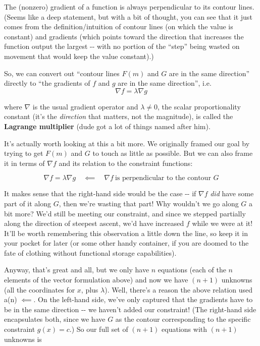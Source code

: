 \documentclass[letterpaper,12pt]{report}
\begin{document}
The (nonzero) gradient of a function is always perpendicular to its
contour lines. (Seems like a deep statement, but with a bit of thought,
you can see that it just comes from the definition/intuition of contour
lines (on which the value is constant) and gradients (which points
toward the direction that increases the function output the largest -\/-
with no portion of the ``step'' being wasted on movement that would keep
the value constant).)

So, we can convert out ``contour lines \(F(m)\) and \(G\) are in the same
direction'' directly to ``the gradients of \(f\) and \(g\) are in the same
direction'', i.e. \[\nabla f = \lambda \nabla g \]

where \(\nabla\) is the usual gradient operator and \(\lambda \neq 0\),
the scalar proportionality constant (it's the \emph{direction} that
matters, not the magnitude), is called the \textbf{Lagrange multiplier}
(dude got a lot of things named after him).

It's actually worth looking at this a bit more. We originally framed our
goal by trying to get \(F(m)\) and \(G\) to touch as little as possible.
But we can also frame it in terms of \(\nabla f\) and its relation to
the constraint functions:

\[\nabla f = \lambda \nabla g \quad \impliedby \quad \nabla f \ \text{is perpendicular to the contour } G \]

It makes sense that the right-hand side would be the case -\/- if
\(\nabla f\) \emph{did} have some part of it along \(G\), then we're
wasting that part! Why wouldn't we go along \(G\) a bit more? We'd still
be meeting our constraint, and since we stepped partially along the
direction of steepest ascent, we'd have increased \(f\) while we were at
it! It'll be worth remembering this observation a little down the line,
so keep it in your pocket for later (or some other handy container, if
you are doomed to the fate of clothing without functional storage
capabilities).

Anyway, that's great and all, but we only have \(n\) equations (each of
the \(n\) elements of the vector formulation above) and now we have
\((n+1)\) unknowns (all the coordinates for \(x\), plus \(\lambda\)).
Well, there's a reason the above relation used a(n) \(\impliedby\). On
the left-hand side, we've only captured that the gradients have to be in
the same direction -\/- we haven't added our constraint! (The right-hand
side encapsulates both, since we have \(G\) as the contour corresponding
to the specific constraint \(g(x) = c\).) So our full set of \((n+1)\)
equations with \((n+1)\) unknowns is
\end{document}
